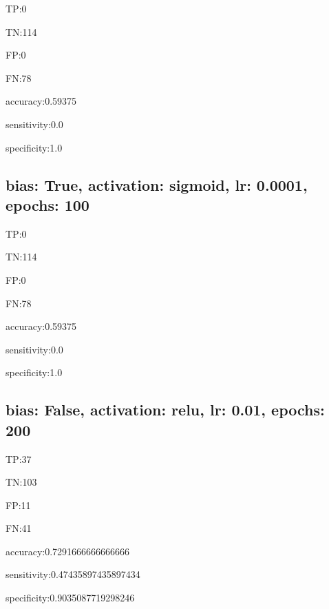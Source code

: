 \documentclass{article}
\begin{document}
TP:0

TN:114

FP:0

FN:78

accuracy:0.59375

sensitivity:0.0

specificity:1.0



\subsection{bias: True, activation: sigmoid, lr: 0.0001, epochs: 100}

TP:0

TN:114

FP:0

FN:78

accuracy:0.59375

sensitivity:0.0

specificity:1.0



\subsection{bias: False, activation: relu, lr: 0.01, epochs: 200}

TP:37

TN:103

FP:11

FN:41

accuracy:0.7291666666666666

sensitivity:0.47435897435897434

specificity:0.9035087719298246
\end{document}
